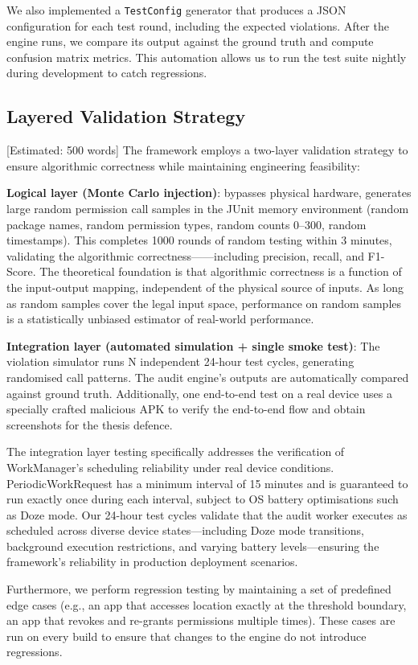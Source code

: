 We also implemented a \texttt{TestConfig} generator that produces a JSON configuration for each test round, including the expected violations. After the engine runs, we compare its output against the ground truth and compute confusion matrix metrics. This automation allows us to run the test suite nightly during development to catch regressions.

\subsection{Layered Validation Strategy} [Estimated: 500 words]
The framework employs a two-layer validation strategy to ensure algorithmic correctness while maintaining engineering feasibility:

\textbf{Logical layer (Monte Carlo injection)}: bypasses physical hardware, generates large random permission call samples in the JUnit memory environment (random package names, random permission types, random counts 0--300, random timestamps). This completes 1000 rounds of random testing within 3 minutes, validating the algorithmic correctness——including precision, recall, and F1-Score. The theoretical foundation is that algorithmic correctness is a function of the input-output mapping, independent of the physical source of inputs. As long as random samples cover the legal input space, performance on random samples is a statistically unbiased estimator of real-world performance.

\textbf{Integration layer (automated simulation + single smoke test)}: The violation simulator runs N independent 24-hour test cycles, generating randomised call patterns. The audit engine's outputs are automatically compared against ground truth. Additionally, one end-to-end test on a real device uses a specially crafted malicious APK to verify the end-to-end flow and obtain screenshots for the thesis defence.

The integration layer testing specifically addresses the verification of WorkManager's scheduling reliability under real device conditions. PeriodicWorkRequest has a minimum interval of 15 minutes and is guaranteed to run exactly once during each interval, subject to OS battery optimisations such as Doze mode. Our 24-hour test cycles validate that the audit worker executes as scheduled across diverse device states—including Doze mode transitions, background execution restrictions, and varying battery levels—ensuring the framework's reliability in production deployment scenarios.

Furthermore, we perform regression testing by maintaining a set of predefined edge cases (e.g., an app that accesses location exactly at the threshold boundary, an app that revokes and re-grants permissions multiple times). These cases are run on every build to ensure that changes to the engine do not introduce regressions.


